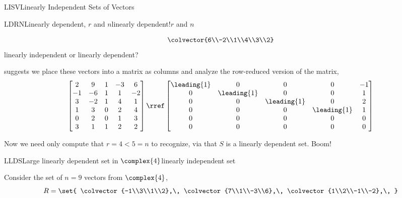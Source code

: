 \begin{subsect}{LISV}{Linearly Independent Sets of Vectors}
\begin{example}{LDRN}{Linearly dependent, $r$ and $n$}{linearly dependent!$r$ and $n$}
\begin{para}
\begin{equation*}
{\colvector{6\\-2\\1\\4\\3\\2}
}
\end{equation*}
%
linearly independent or linearly dependent?\end{para}
%
\begin{para} suggests we place these vectors into a matrix as columns and analyze the row-reduced version of the matrix,
%
\begin{equation*}
\begin{bmatrix}
2 & 9 & 1 & -3 & 6\\
-1 & -6 & 1 & 1 & -2\\
3 & -2 & 1 & 4 & 1\\
1 & 3 & 0 & 2 & 4\\
0 & 2 & 0 & 1 & 3\\
3 & 1 & 1 & 2 & 2
\end{bmatrix}
\rref
\begin{bmatrix}
\leading{1} & 0 & 0 & 0 & -1\\
0 & \leading{1} & 0 & 0 & 1\\
0 & 0 & \leading{1} & 0 & 2\\
0 & 0 & 0 & \leading{1} & 1\\
0 & 0 & 0 & 0 & 0\\
0 & 0 & 0 & 0 & 0
\end{bmatrix}
\end{equation*}
\end{para}
%
\begin{para}Now we need only compute that
$r=4<5=n$
to recognize, via  that $S$ is a linearly dependent set.  Boom!\end{para}
%
\end{example}
%
\begin{example}{LLDS}{Large linearly dependent set in $\complex{4}$}{linearly independent set}
\begin{para}Consider the set of $n=9$ vectors from $\complex{4}$,
%
\begin{equation*}
R=\set{
\colvector{-1\\3\\1\\2},\,
\colvector{7\\1\\-3\\6},\,
\colvector{1\\2\\-1\\-2},\,
}
\end{equation*}
\end{para}
\end{example}
\end{subsect}
